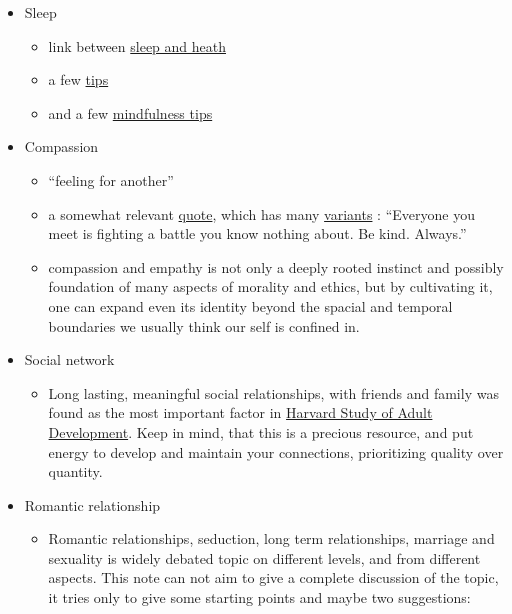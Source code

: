 \documentclass{article}
\begin{document}
\begin{itemize}
    \item Sleep
    \begin{itemize}
        \item link between \href{https://www.healthline.com/nutrition/10-reasons-why-good-sleep-is-important#10.-Sleep-affects-emotions-and-social-interactions}{sleep and heath}
        \item a few \href{https://www.healthline.com/nutrition/ways-to-fall-asleep#_noHeaderPrefixedContent}{tips}
        \item and a few \href{https://mindfulnessexercises.com/sleep-meditation-scripts/}{mindfulness tips}
    \end{itemize}
    \item Compassion
    \begin{itemize}
        \item ``feeling for another''
        \item a somewhat relevant \href{https://www.goodreads.com/quotes/6697537-everyone-you-meet-is-fighting-a-battle-you-know-nothing}{quote}, which has many \href{https://quoteinvestigator.com/2010/06/29/be-kind/#more-778}{variants} : ``Everyone you meet is fighting a battle you know nothing about. Be kind. Always.''
        \item compassion and empathy is not only a deeply rooted instinct and possibly foundation of many aspects of morality and ethics, but by cultivating it, one can expand even its identity beyond the spacial and temporal boundaries we usually think our self is confined in.
    \end{itemize}
    \item Social network
    \begin{itemize}
    \item Long lasting, meaningful social relationships, with friends and family was found as the most important factor in \href{https://news.harvard.edu/gazette/story/2017/04/over-nearly-80-years-harvard-study-has-been-showing-how-to-live-a-healthy-and-happy-life/}{Harvard Study of Adult Development}.
    Keep in mind, that this is a precious resource, and put energy to develop and maintain your connections, prioritizing quality over quantity.
    \end{itemize}
    \item Romantic relationship
    \begin{itemize}
        \item Romantic relationships, seduction, long term relationships, marriage and sexuality is widely debated topic on different levels, and from different aspects. This note can not aim to give a complete discussion of the topic, it tries only to give some starting points and maybe two suggestions:

\end{itemize}
\end{itemize}
\end{document}
